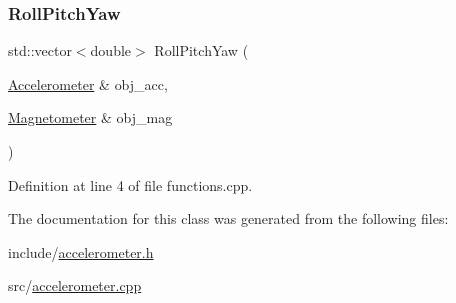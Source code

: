 \subsubsection{\texorpdfstring{Roll\+Pitch\+Yaw}{RollPitchYaw}}
{\footnotesize\ttfamily std\+::vector$<$double$>$ Roll\+Pitch\+Yaw (\begin{DoxyParamCaption}\item[{\hyperlink{classsensor_1_1_accelerometer}{Accelerometer} \&}]{obj\+\_\+acc,  }\item[{\hyperlink{classsensor_1_1_magnetometer}{Magnetometer} \&}]{obj\+\_\+mag }\end{DoxyParamCaption})\hspace{0.3cm}{\ttfamily [friend]}}



Definition at line 4 of file functions.\+cpp.



The documentation for this class was generated from the following files\+:\begin{DoxyCompactItemize}
\item 
include/\hyperlink{accelerometer_8h}{accelerometer.\+h}\item 
src/\hyperlink{accelerometer_8cpp}{accelerometer.\+cpp}\end{DoxyCompactItemize}
